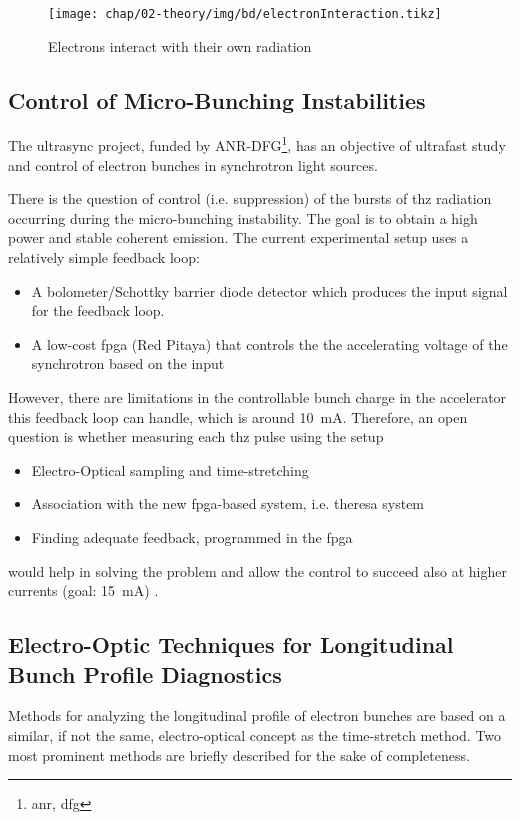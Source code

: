 \begin{figure}[tb]
	\centering
	\texttt{[image: chap/02-theory/img/bd/electronInteraction.tikz]}
	\caption{Electrons interact with their own radiation \cite{Bielawski2019}}
	\label{fig:electronInteract}
\end{figure}

\subsection*{Control of Micro-Bunching Instabilities}
The \gls{ultrasync} project, funded by ANR-DFG\footnote{\gls{anr}, \gls{dfg}}, has an objective of ultrafast study and control of electron bunches in synchrotron light sources.

There is the question of control (i.e. suppression) of the bursts of \gls{thz} radiation occurring during the micro-bunching instability.
The goal is to obtain a high power and stable coherent emission. 
The current experimental setup uses a relatively simple feedback loop:
\begin{itemize}
	\item A bolometer/Schottky barrier diode detector which produces the input signal for the feedback loop.
	\item A low-cost \gls{fpga} (Red Pitaya) that controls the the accelerating voltage of the synchrotron based on the input
\end{itemize} %

However, there are limitations in the controllable bunch charge in the accelerator this feedback loop can handle, which is around \SI{10}{\milli \ampere}. 
Therefore, an open question is whether measuring each \gls{thz} pulse using the setup
\begin{itemize}
	\item Electro-Optical sampling and time-stretching
	\item Association with the new \gls{fpga}-based system, i.e. \gls{theresa} system
	\item Finding adequate feedback, programmed in the \gls{fpga}
\end{itemize}
would help in solving the problem and allow the control to succeed also at higher currents (goal: \SI{15}{\milli \ampere}) \cite{bielwaski}.

\subsection{Electro-Optic Techniques for Longitudinal Bunch Profile Diagnostics}
Methods for analyzing the longitudinal profile of electron bunches are based on a similar, if not the same, electro-optical concept as the time-stretch method. 
Two most prominent methods are briefly described for the sake of completeness.
